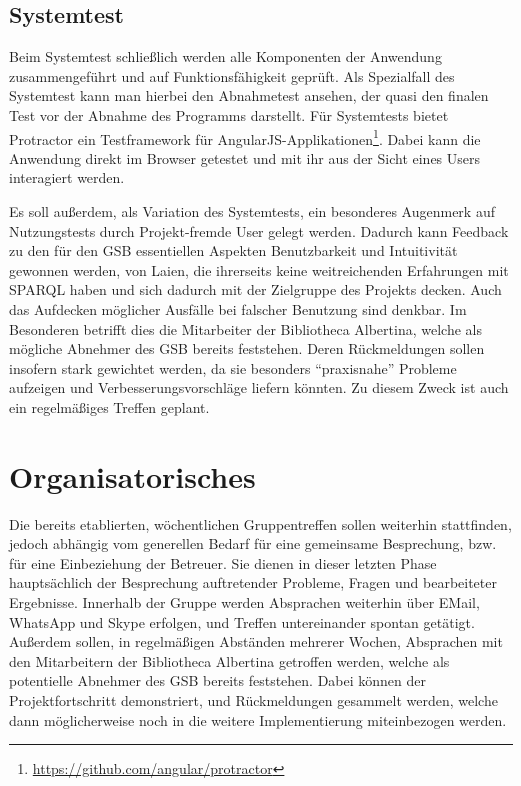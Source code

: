 \subsection*{Systemtest}
Beim Systemtest schließlich werden alle Komponenten der Anwendung zusammengeführt und auf Funktionsfähigkeit geprüft. Als Spezialfall des Systemtest kann man hierbei den Abnahmetest ansehen, der quasi den finalen Test vor der Abnahme des Programms darstellt.
Für Systemtests bietet Protractor ein Testframework für AngularJS-Applikationen\footnote{\url{https://github.com/angular/protractor} }. Dabei kann die Anwendung direkt im Browser getestet und mit ihr aus der Sicht eines Users interagiert werden.%

Es soll außerdem, als Variation des Systemtests, ein besonderes Augenmerk auf Nutzungstests durch Projekt-fremde User gelegt werden. Dadurch kann Feedback zu den für den GSB essentiellen Aspekten Benutzbarkeit und Intuitivität gewonnen werden, von Laien, die ihrerseits keine weitreichenden Erfahrungen mit SPARQL haben und sich dadurch mit der Zielgruppe des Projekts decken. Auch das Aufdecken möglicher Ausfälle bei falscher Benutzung sind denkbar.
Im Besonderen betrifft dies die Mitarbeiter der Bibliotheca Albertina, welche als mögliche Abnehmer des GSB bereits feststehen. Deren Rückmeldungen sollen insofern stark gewichtet werden, da sie besonders “praxisnahe” Probleme aufzeigen und Verbesserungsvorschläge liefern könnten. Zu diesem Zweck ist auch ein regelmäßiges Treffen geplant.

\section{Organisatorisches}

Die bereits etablierten, wöchentlichen Gruppentreffen sollen weiterhin stattfinden, jedoch abhängig vom generellen Bedarf für eine gemeinsame Besprechung, bzw. für eine Einbeziehung der Betreuer. Sie dienen in dieser letzten Phase hauptsächlich der Besprechung auftretender Probleme, Fragen und bearbeiteter Ergebnisse. Innerhalb der Gruppe werden Absprachen weiterhin über EMail, WhatsApp und Skype erfolgen, und Treffen untereinander spontan getätigt.
Außerdem sollen, in regelmäßigen Abständen mehrerer Wochen, Absprachen mit den Mitarbeitern der Bibliotheca Albertina getroffen werden, welche als potentielle Abnehmer des GSB bereits feststehen. Dabei können der Projektfortschritt demonstriert, und Rückmeldungen gesammelt werden, welche dann möglicherweise noch in die weitere Implementierung miteinbezogen werden.

